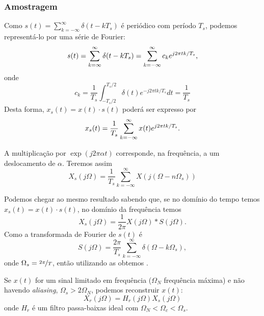 \begin{frame}[allowframebreaks]
  \frametitle{Amostragem}
  Como $s(t) = \sum_{k=-\infty}^{\infty} \delta(t - kT_s)$ é periódico com período $T_s$,
  podemos representá-lo por uma série de Fourier:
  \begin{equation}
  s(t) = \sum_{k=\infty}^{\infty} \delta(t - kT_s) = \sum_{k=-\infty}^{\infty} c_k e^{j 2 \pi t k /T_s} \textmd{,}
  \end{equation}
  onde
  \begin{equation}
  c_k = \frac{1}{T_s} \int_{-T_s/2}^{T_s/2} \delta(t) e^{-j2\pi t k/T_s} dt = \frac{1}{T_s}
  \end{equation}
  Desta forma, $x_s(t) = x(t) \cdot s(t)$ poderá ser expresso por
  \begin{equation}
  x_s(t) = \frac{1}{T_s} \sum_{k=-\infty}^{\infty} x(t) e^{j2\pi tk /T_s} \textmd{.}
  \end{equation}

  A multiplicação por $\exp(j 2\pi \alpha t)$ corresponde, na frequência, a um deslocamento de $\alpha$. 
  Teremos assim
  \begin{equation}\label{eq-Xs-freqdom}
  X_s(j \Omega) = \frac{1}{T_s} \sum_{k=-\infty}^{\infty} X \left( j (\Omega - n \Omega_s) \right)
  \end{equation}

  
  \framebreak

  Podemos chegar ao mesmo resultado sabendo que, se no domínio do tempo temos $x_s(t) = x(t) \cdot s(t)$, 
  no domínio da frequência temos
  \begin{equation}\label{eq-conv-dom-freq}
  X_s(j \Omega) = \frac{1}{2\pi} X(j \Omega) \ast S(j \Omega) .
  \end{equation} 
  Como a transformada de Fourier de $s(t)$ é
  \begin{equation}\label{eq-pulse-train-freq}
  S(j \Omega) = \frac{2\pi}{T_s} \sum_{k=-\infty}^{\infty} \delta(\Omega - k \Omega_s) ,
  \end{equation}
  onde $\Omega_s = \nicefrac{2\pi}{T}$, então utilizando as  obtemos .

  \framebreak

  Se $x(t)$ for um sinal limitado em frequência ($\Omega_N$ frequência máxima) e
  não havendo \textit{aliasing}, $\Omega_s > 2 \Omega_N$, podemos reconstruir $x(t)$:
  \begin{equation}\label{eq-x-reconstruido}
  X_r(j \Omega) = H_r(j \Omega) X_s(j \Omega)
  \end{equation}
  onde $H_r$ é um filtro passa-baixas ideal com $\Omega_N < \Omega_c < \Omega_s$.


\end{frame}
